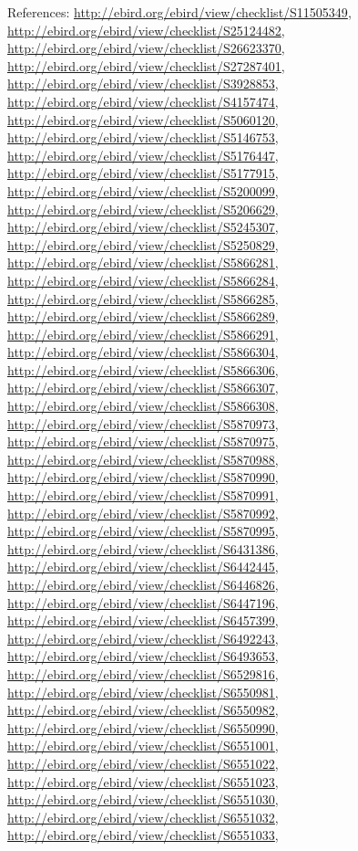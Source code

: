 \documentclass[9pt, article]{memoir}
\begin{document}
\begin{multicols}{2}
References: 
\url{http://ebird.org/ebird/view/checklist/S11505349}, 
\url{http://ebird.org/ebird/view/checklist/S25124482}, 
\url{http://ebird.org/ebird/view/checklist/S26623370}, 
\url{http://ebird.org/ebird/view/checklist/S27287401}, 
\url{http://ebird.org/ebird/view/checklist/S3928853}, 
\url{http://ebird.org/ebird/view/checklist/S4157474}, 
\url{http://ebird.org/ebird/view/checklist/S5060120}, 
\url{http://ebird.org/ebird/view/checklist/S5146753}, 
\url{http://ebird.org/ebird/view/checklist/S5176447}, 
\url{http://ebird.org/ebird/view/checklist/S5177915}, 
\url{http://ebird.org/ebird/view/checklist/S5200099}, 
\url{http://ebird.org/ebird/view/checklist/S5206629}, 
\url{http://ebird.org/ebird/view/checklist/S5245307}, 
\url{http://ebird.org/ebird/view/checklist/S5250829}, 
\url{http://ebird.org/ebird/view/checklist/S5866281}, 
\url{http://ebird.org/ebird/view/checklist/S5866284}, 
\url{http://ebird.org/ebird/view/checklist/S5866285}, 
\url{http://ebird.org/ebird/view/checklist/S5866289}, 
\url{http://ebird.org/ebird/view/checklist/S5866291}, 
\url{http://ebird.org/ebird/view/checklist/S5866304}, 
\url{http://ebird.org/ebird/view/checklist/S5866306}, 
\url{http://ebird.org/ebird/view/checklist/S5866307}, 
\url{http://ebird.org/ebird/view/checklist/S5866308}, 
\url{http://ebird.org/ebird/view/checklist/S5870973}, 
\url{http://ebird.org/ebird/view/checklist/S5870975}, 
\url{http://ebird.org/ebird/view/checklist/S5870988}, 
\url{http://ebird.org/ebird/view/checklist/S5870990}, 
\url{http://ebird.org/ebird/view/checklist/S5870991}, 
\url{http://ebird.org/ebird/view/checklist/S5870992}, 
\url{http://ebird.org/ebird/view/checklist/S5870995}, 
\url{http://ebird.org/ebird/view/checklist/S6431386}, 
\url{http://ebird.org/ebird/view/checklist/S6442445}, 
\url{http://ebird.org/ebird/view/checklist/S6446826}, 
\url{http://ebird.org/ebird/view/checklist/S6447196}, 
\url{http://ebird.org/ebird/view/checklist/S6457399}, 
\url{http://ebird.org/ebird/view/checklist/S6492243}, 
\url{http://ebird.org/ebird/view/checklist/S6493653}, 
\url{http://ebird.org/ebird/view/checklist/S6529816}, 
\url{http://ebird.org/ebird/view/checklist/S6550981}, 
\url{http://ebird.org/ebird/view/checklist/S6550982}, 
\url{http://ebird.org/ebird/view/checklist/S6550990}, 
\url{http://ebird.org/ebird/view/checklist/S6551001}, 
\url{http://ebird.org/ebird/view/checklist/S6551022}, 
\url{http://ebird.org/ebird/view/checklist/S6551023}, 
\url{http://ebird.org/ebird/view/checklist/S6551030}, 
\url{http://ebird.org/ebird/view/checklist/S6551032}, 
\url{http://ebird.org/ebird/view/checklist/S6551033}, 

\end{multicols}
\end{document}
